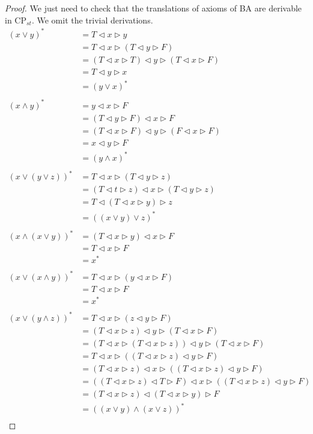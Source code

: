 \documentclass[a4paper,twoside,openright]{report}
\newcommand{\lef}{\ensuremath{\triangleleft}}
\newcommand{\rig}{\ensuremath{\triangleright}}
\begin{document}
\begin{proof}
We just need to check that the translations of axioms of BA are derivable in $\text{CP}_{st}$. We omit the trivial derivations.
\begin{align*}
(x\vee y)^* &= T\lef x\rig y\\
&= T\lef x\rig (T\lef y\rig F)\\
&= (T\lef x\rig T)\lef y\rig(T\lef x\rig F)\\
&= T\lef y\rig x\\
&= (y\lor x)^*\\\\
(x\land y)^*
&= y\lef x\rig F\\
&= (T\lef y\rig F)\lef x\rig F\\
&= (T\lef x\rig F)\lef y\rig (F\lef x\rig F)\\
&= x\lef y\rig F\\
&= (y\land x)^*\\\\
(x\lor(y\lor z))^*
&= T\lef x\rig(T\lef y\rig z)\\
&= (T\lef t\rig z)\lef x\rig (T\lef y\rig z)\\
&= T\lef(T\lef x\rig y)\rig z\\
&= ((x\lor y)\lor z)^*\\\\
(x\land (x\lor y))^*
&= (T\lef x\rig y)\lef x\rig F\\
&= T\lef x\rig F\\
&= x^*\\\\
(x\lor(x\land y))^*
&= T\lef x\rig(y\lef x\rig F)\\
&= T\lef x\rig F\\
&= x^*\\\\
(x\vee(y\wedge z))^*
&=T\lef x\rig(z\lef y\rig F)\\
&=(T\lef x\rig z)\lef y\rig(T\lef x\rig F)\\
&=(T\lef x\rig (T\lef x\rig z))\lef y\rig(T\lef x\rig F)\\
&=T\lef x\rig((T\lef x\rig z)\lef y\rig F)\\
&=(T\lef x\rig z)\lef x\rig((T\lef x\rig z)\lef y\rig F)\\
&=((T\lef x\rig z)\lef T\rig F)\lef x\rig((T\lef x\rig z)\lef y\rig F)\\
&=(T\lef x\rig z)\lef(T\lef x\rig y)\rig F\\
&=((x\vee y)\wedge(x\vee z))^*\\
\end{align*}


\end{proof}
\end{document}

